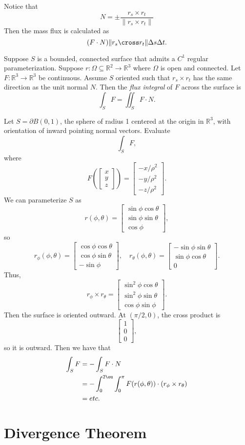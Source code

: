 \documentclass[11pt]{article}
\theoremstyle{definition}
\newcommand{\R}{\mathbb{R}}                      %
\newcommand{\mat}{\begin{bmatrix}}
\newcommand{\trix}{\end{bmatrix}}
\newcommand{\dell}{\partial}
\begin{document}
\note Notice that 
$$
N=\pm \frac{r_s\times r_t}{\|r_s\times r_t\|}
$$
Then the mass flux is calculated as
$$
(F\cdot N)\|r_s\cross r_t\|\Delta s \Delta t.
$$
\begin{mdframed}[backgroundcolor = blue!10]
\vspace{+0.1cm}
 Suppose $S$ is a bounded, connected surface that admits a $C^1$ regular parameterization. Suppose $r:\Omega \subseteq \R^2\to \R^3$ where $\Omega$ is open and connected. Let $F:\R^3 \to \R^3$ be continuous. Assume $S$ oriented such that $r_s\times r_t$ has the same direction as the unit normal $N$. Then the \textit{flux integral} of $F$ across the surface is 
$$
\int_S F = \iint_S F\cdot N.
$$
\end{mdframed}
\ex Let $S=\dell B(0,1)$, the sphere of radius 1 centered at the origin in $\R^3$, with orientation of inward pointing normal vectors. Evaluate
$$
\int_S F,
$$
where
$$
F\left(\mat x \\ y \\ z \trix\right)= \mat -x/\rho^2 \\ -y/\rho^2 \\ -z/\rho^2 \trix.
$$
We can parameterize $S$ as
$$
r(\phi,\theta)=\mat \sin\phi\cos\theta \\ \sin\phi\sin\theta \\ \cos\phi \trix,
$$
so
$$
r_\phi(\phi,\theta) = \mat \cos\phi \cos\theta \\ \cos\phi \sin \theta \\ -\sin\phi \trix,\quad r_\theta (\phi, \theta)=\mat -\sin\phi\sin\theta \\ \sin\phi\cos\theta \\ 0 \trix .
$$
Thus,
$$
r_\phi \times r_\theta = \mat \sin^2 \phi \cos\theta \\ \sin^2\phi \sin\theta \\ \cos\phi\sin\phi\trix.
$$
Then the surface is oriented outward. At $(\pi/2,0)$, the cross  product is
$$
\mat 1\\ 0\\0 \trix,
$$
so it is outward. Then we have that
$$
\begin{aligned}
\int_S F& = -\int_S F\cdot N \\
&=-\int_0^{2\ou} \int_0^\pi F(r(\phi, \theta))\cdot (r_\phi\times r_\theta) \\
&= etc.
\end{aligned}
$$

\section{Divergence Theorem}
\end{document}
